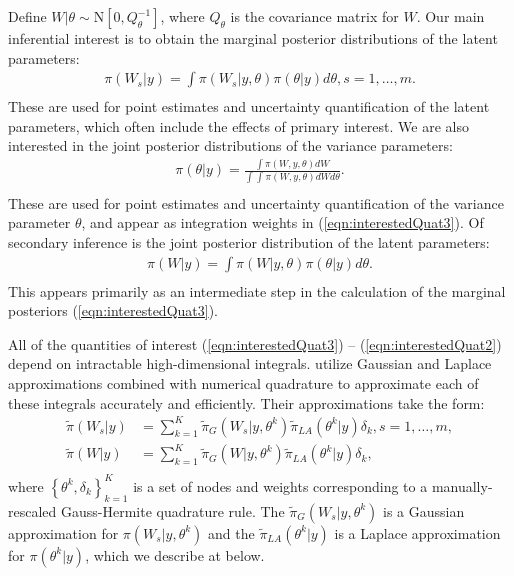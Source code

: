 \documentclass[ba]{imsart}
\begin{document}
Define $W|\theta\sim\text{N}\left[ 0,Q^{-1}_{\theta}\right]$, where $Q_{\theta}$ is the covariance matrix for $W$. Our main inferential interest is to obtain the marginal posterior distributions of the latent parameters:
\begin{equation}\begin{aligned}\label{eqn:interestedQuat3}
\pi(W_{s}|y) = \int \pi(W_{s}|y,\theta) \pi(\theta|y) d\theta, s = 1,\ldots,m .  \\
\end{aligned}\end{equation}
These are used for point estimates and uncertainty quantification of the latent parameters, which often include the effects of primary interest. We are also interested in the joint posterior distributions of the variance parameters:
\begin{equation}\begin{aligned}\label{eqn:interestedQuat1}
\pi(\theta|y) = \frac{\int \pi(W,y,\theta) dW}{\int_{} \int_{} \pi(W,y,\theta) dW d\theta } . \\
\end{aligned}\end{equation}
These are used for point estimates and uncertainty quantification of the variance parameter $\theta$, and appear as integration weights in (\ref{eqn:interestedQuat3}). Of secondary inference is the joint posterior distribution of the latent parameters:
\begin{equation}\begin{aligned}\label{eqn:interestedQuat2}
\pi(W|y) = \int \pi(W|y,\theta) \pi(\theta|y) d\theta .  \\
\end{aligned}\end{equation}
This appears primarily as an intermediate step in the calculation of the marginal posteriors (\ref{eqn:interestedQuat3}).

All of the quantities of interest (\ref{eqn:interestedQuat3}) -- (\ref{eqn:interestedQuat2}) depend on intractable high-dimensional integrals. \cite{casecross} utilize Gaussian and Laplace approximations combined with numerical quadrature to approximate each of these integrals accurately and efficiently. Their approximations take the form:
\begin{equation}\begin{aligned}\label{eqn:integration}
\tilde{\pi}(W_{s}|y) &= \sum_{k=1}^{K}
\tilde{\pi}_{G}(W_{s}|y,\theta^{k})
\tilde{\pi}_{LA}(\theta^{k}|y)\delta_{k}, s = 1,\ldots,m , \\
\tilde{\pi}(W|y) &= \sum_{k=1}^{K}
\tilde{\pi}_{G}(W|y,\theta^{k})
\tilde{\pi}_{LA}(\theta^{k}|y)\delta_{k} , \\
\end{aligned}\end{equation}
where $\left\{\theta^{k},\delta_{k}\right\}_{k=1}^{K}$ is a set of nodes and weights corresponding to a manually-rescaled Gauss-Hermite quadrature rule. The $\tilde{\pi}_{G}(W_{s}|y,\theta^{k})$ is a Gaussian approximation for $\pi(W_{s}|y,\theta^{k})$ and the $\tilde{\pi}_{LA}(\theta^{k}|y)$ is a Laplace approximation for $\pi(\theta^{k}|y)$, which we describe at below.
\end{document}
